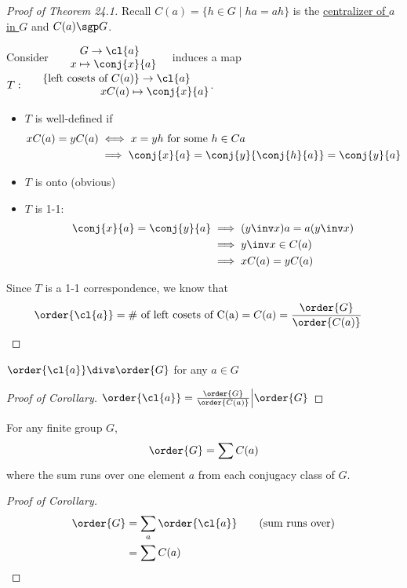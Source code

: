 \begin{proof}[Proof of Theorem 24.1]
Recall \(C(a) = \{h\in G \mid ha=ah\}\) is the \uline{centralizer of \(a\) in \(G\)} and \(C(a)\sgp G\).

Consider \( \quad\begin{matrix}
    G\to \cl{a} \\
    \ \ x\mapsto \conj{x}{a}
\end{matrix}\quad \) induces a map \(T:\begin{matrix}
    \{\text{left cosets of } C(a)\} \to \cl{a} \\
    \qquad \qquad \qquad \quad xC(a) \mapsto \conj{x}{a}
\end{matrix}\).

\begin{itemize}
    \item \(T\) is well-defined if \begin{align*}
        xC(a) = yC(a) &\iff x=yh \text{ for some } h\in C{a} \\
            &\implies \conj{x}{a} = \conj{y}{\conj{h}{a}} = \conj{y}{a}
    \end{align*}
    \item \(T\) is onto (obvious)
    \item \(T\) is 1-1: \begin{align*}
        \conj{x}{a} = \conj{y}{a} &\implies (y\inv x)a = a(y\inv x) \\
        &\implies y\inv x \in C(a) \\
        &\implies xC(a) = yC(a)
    \end{align*}
\end{itemize}
Since \(T\) is a 1-1 correspondence, we know that \begin{align*}
    \order{\cl{a}} &= \text{\# of left cosets of C(a)} = \index{G}{C(a)} = \frac{\order{G}}{\order{C(a)}}
\end{align*}
\end{proof}

\begin{corollary}
  \(\order{\cl{a}}\divs \order{G}\) for any \(a\in G\)
\end{corollary}

\begin{proof}[Proof of Corollary]
    \(\order{\cl{a}} = \frac{\order{G}}{\order{C(a)}} \Big\vert \order{G}\)
\end{proof}

\begin{corollary}
  For any finite group \(G\), \begin{align*}
    \order{G} = \sum \index{G}{C(a)}
  \end{align*}
  where the sum runs over one element \(a\) from each conjugacy class of \(G\).
\end{corollary}
\begin{proof}[Proof of Corollary]
    \begin{align*}
        \order{G} &= \sum_a \order{\cl{a}}\qquad\text{(sum runs over)} \\
        &= \sum \index{G}{C(a)}
    \end{align*}
\end{proof}

